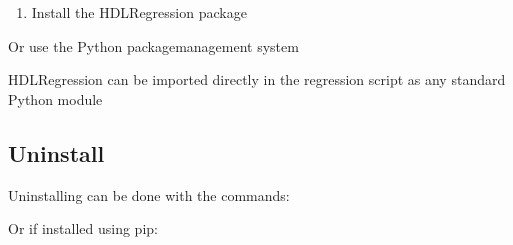 \documentclass[letterpaper,10pt,english]{sphinxmanual}
\begin{document}
\begin{sphinxVerbatim}[commandchars=\\\{\}]
\end{sphinxVerbatim}
\begin{enumerate}
%
\setcounter{enumi}{1}
\item {} 
\sphinxAtStartPar
Install the HDLRegression package

\end{enumerate}

\begin{sphinxVerbatim}[commandchars=\\\{\}]
\end{sphinxVerbatim}

\sphinxAtStartPar
Or use the Python package\sphinxhyphen{}management system

\begin{sphinxVerbatim}[commandchars=\\\{\}]
\end{sphinxVerbatim}

\sphinxAtStartPar
HDLRegression can be imported directly in the regression script as any standard Python module

\begin{sphinxVerbatim}[commandchars=\\\{\}]
   
\end{sphinxVerbatim}


\subsection{Uninstall}
\label{\detokenize{intro:uninstall}}
\sphinxAtStartPar
Uninstalling can be done with the commands:

\begin{sphinxVerbatim}[commandchars=\\\{\}]
\end{sphinxVerbatim}

\sphinxAtStartPar
Or if installed using pip:

\begin{sphinxVerbatim}[commandchars=\\\{\}]
\end{sphinxVerbatim}
\end{document}
